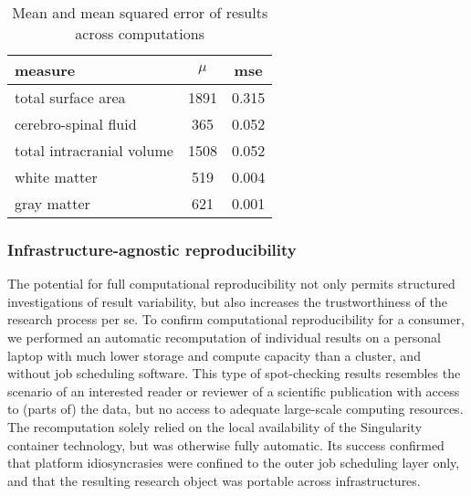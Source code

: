 \begin{table}[H]
	\centering
	\begin{tabular}{lcc}
		\toprule
		measure & $\mu$ & \gls{mse} \\ \midrule
		total surface area & 1891 & 0.315 \\
		cerebro-spinal fluid & 365 & 0.052 \\
        total intracranial volume & 1508 & 0.052\\
        white matter & 519 & 0.004\\
        gray matter & 621 & 0.001\\
		\bottomrule
	\end{tabular}
	\caption[Mean and mean squared error of results across computations]{Mean and mean squared error of results across computations}
	\label{tab:fairly_mse}
\end{table}


\subsubsection{Infrastructure-agnostic reproducibility}

The potential for full computational reproducibility not only permits structured investigations of result variability, but also increases the trustworthiness of the research process per se.
To confirm computational reproducibility for a consumer, we performed an automatic recomputation of individual results on a personal laptop with much lower storage and compute capacity than a cluster, and without job scheduling software.
This type of spot-checking results resembles the scenario of an interested reader or reviewer of a scientific publication with access to (parts of) the data, but no access to adequate large-scale computing resources.
The recomputation solely relied on the local availability of the Singularity container technology, but was otherwise fully automatic.
Its success confirmed that platform idiosyncrasies were confined to the outer job scheduling layer only, and that the resulting research object was portable across infrastructures.

